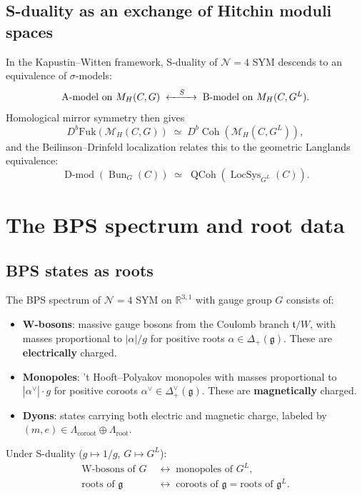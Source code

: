 \documentclass[11pt]{article}
\theoremstyle{definition}
\theoremstyle{remark}
\DeclareMathOperator{\Bun}{Bun}
\DeclareMathOperator{\LocSys}{LocSys}
\DeclareMathOperator{\QCoh}{QCoh}
\DeclareMathOperator{\Dmod}{D\text{-}mod}
\DeclareMathOperator{\Coh}{Coh}
\newcommand{\g}{\mathfrak{g}}
\newcommand{\gL}{\mathfrak{g}^L}
\begin{document}
\subsection{S-duality as an exchange of Hitchin moduli spaces}

In the Kapustin--Witten framework, S-duality of $\mathcal{N}=4$ SYM descends
to an equivalence of $\sigma$-models:
\begin{equation}\label{eq:hitchin-sduality}
 \text{A-model on } \mathcal{M}_H(C,G)
 \;\xleftrightarrow{\quad S \quad}\;
 \text{B-model on } \mathcal{M}_H(C,G^L).
\end{equation}
Homological mirror symmetry then gives
\[
 D^b\mathrm{Fuk}(\mathcal{M}_H(C,G))
 \;\simeq\;
 D^b\Coh(\mathcal{M}_H(C,G^L)),
\]
and the Beilinson--Drinfeld localization relates this to the geometric
Langlands equivalence:
\[
 \Dmod(\Bun_G(C)) \;\simeq\;
 \QCoh(\LocSys_{G^L}(C)).
\]


\section{The BPS spectrum and root data}
\label{sec:bps-roots}

\subsection{BPS states as roots}

The BPS spectrum of $\mathcal{N}=4$ SYM on $\mathbb{R}^{3,1}$ with gauge
group $G$ consists of:
\begin{itemize}
 \item \textbf{W-bosons}: massive gauge bosons from the Coulomb branch
 $\mathfrak{t}/W$, with masses proportional to $|\alpha|/g$ for positive
 roots $\alpha \in \Delta_+(\g)$. These are \textbf{electrically} charged.
 \item \textbf{Monopoles}: 't Hooft--Polyakov monopoles with masses
 proportional to $|\alpha^\vee| \cdot g$ for positive coroots
 $\alpha^\vee \in \Delta_+^\vee(\g)$. These are \textbf{magnetically}
 charged.
 \item \textbf{Dyons}: states carrying both electric and magnetic charge,
 labeled by $(m, e) \in \Lambda_{\mathrm{coroot}} \oplus
 \Lambda_{\mathrm{root}}$.
\end{itemize}

Under S-duality ($g \mapsto 1/g$, $G \mapsto G^L$):
\begin{align}
 \text{W-bosons of } G &\;\longleftrightarrow\;
 \text{monopoles of } G^L, \\
 \text{roots of } \g &\;\longleftrightarrow\;
 \text{coroots of } \g = \text{roots of } \gL.
\end{align}
\end{document}
